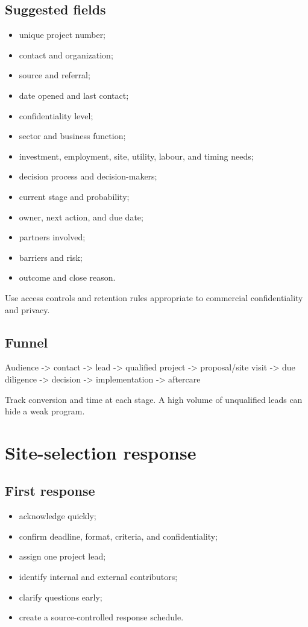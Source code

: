 \documentclass[11pt,letterpaper,oneside,openany]{book}
\begin{document}
\subsection[Suggested fields]{Suggested fields}
\begin{itemize}
\item unique project number;
\item contact and organization;
\item source and referral;
\item date opened and last contact;
\item confidentiality level;
\item sector and business function;
\item investment, employment, site, utility, labour, and timing needs;
\item decision process and decision-makers;
\item current stage and probability;
\item owner, next action, and due date;
\item partners involved;
\item barriers and risk;
\item outcome and close reason.
\end{itemize}


Use access controls and retention rules appropriate to commercial confidentiality and privacy.


\subsection[Funnel]{Funnel}
\begin{guidequote}
Audience -\textgreater{} contact -\textgreater{} lead -\textgreater{} qualified project -\textgreater{} proposal/site visit -\textgreater{} due diligence -\textgreater{} decision -\textgreater{} implementation -\textgreater{} aftercare

\end{guidequote}


Track conversion and time at each stage. A high volume of unqualified leads can hide a weak program.


\section[Site-selection response]{Site-selection response}
\subsection[First response]{First response}
\begin{itemize}
\item acknowledge quickly;
\item confirm deadline, format, criteria, and confidentiality;
\item assign one project lead;
\item identify internal and external contributors;
\item clarify questions early;
\item create a source-controlled response schedule.
\end{itemize}
\end{document}
